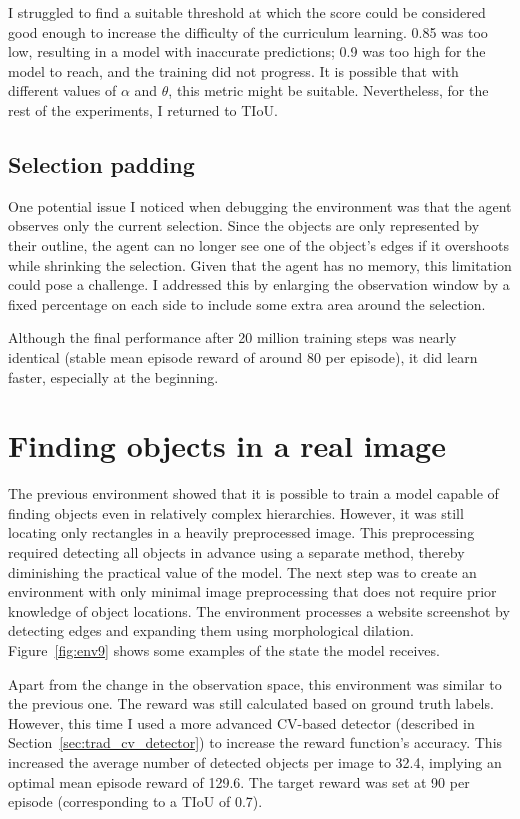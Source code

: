 \documentclass[
  digital,     %
  oneside,     %
  nosansbold,  %
  nocolorbold, %
  lof,         %
  lot,         %
]{fithesis4}
\begin{document}
I struggled to find a suitable threshold at which the score could be considered good enough to increase the difficulty of the curriculum learning. 0.85 was too low, resulting in a model with inaccurate predictions; 0.9 was too high for the model to reach, and the training did not progress. It is possible that with different values of $\alpha$ and $\theta$, this metric might be suitable. Nevertheless, for the rest of the experiments, I returned to TIoU.

\subsection{Selection padding}

One potential issue I noticed when debugging the environment was that the agent observes only the current selection. Since the objects are only represented by their outline, the agent can no longer see one of the object's edges if it overshoots while shrinking the selection. Given that the agent has no memory, this limitation could pose a challenge. I addressed this by enlarging the observation window by a fixed percentage on each side to include some extra area around the selection.

Although the final performance after 20 million training steps was nearly identical (stable mean episode reward of around 80 per episode), it did learn faster, especially at the beginning.

\section{Finding objects in a real image}

The previous environment showed that it is possible to train a model capable of finding objects even in relatively complex hierarchies. However, it was still locating only rectangles in a heavily preprocessed image. This preprocessing required detecting all objects in advance using a separate method, thereby diminishing the practical value of the model. The next step was to create an environment with only minimal image preprocessing that does not require prior knowledge of object locations. The environment processes a website screenshot by detecting edges and expanding them using morphological dilation. Figure~\ref{fig:env9} shows some examples of the state the model receives.

Apart from the change in the observation space, this environment was similar to the previous one. The reward was still calculated based on ground truth labels. However, this time I used a more advanced CV-based detector (described in Section~\ref{sec:trad_cv_detector}) to increase the reward function's accuracy. This increased the average number of detected objects per image to 32.4, implying an optimal mean episode reward of 129.6. The target reward was set at 90 per episode (corresponding to a TIoU of 0.7).
\end{document}
